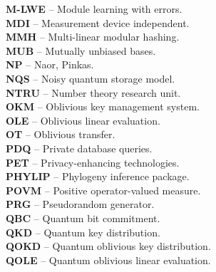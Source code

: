 \textbf{M-LWE} -- Module learning with errors.
\vspace{0.5cm}\\
\textbf{MDI} -- Measurement device independent.
\vspace{0.5cm}\\
\textbf{MMH} -- Multi-linear modular hashing.
\vspace{0.5cm}\\
\textbf{MUB} -- Mutually unbiased bases.
\vspace{0.5cm}\\
\textbf{NP} -- Naor, Pinkas.
\vspace{0.5cm}\\
\textbf{NQS} -- Noisy quantum storage model.
\vspace{0.5cm}\\
\textbf{NTRU} -- Number theory research unit.
\vspace{0.5cm}\\
\textbf{OKM} -- Oblivious key management system.
\vspace{0.5cm}\\
\textbf{OLE} -- Oblivious linear evaluation.
\vspace{0.5cm}\\
\textbf{OT} -- Oblivious transfer.
\vspace{0.5cm}\\
\textbf{PDQ} -- Private database queries.
\vspace{0.5cm}\\
\textbf{PET} -- Privacy-enhancing technologies.
\vspace{0.5cm}\\
\textbf{PHYLIP} -- Phylogeny inference package.
\vspace{0.5cm}\\
\textbf{POVM} -- Positive operator-valued measure.
\vspace{0.5cm}\\
\textbf{PRG} -- Pseudorandom generator.
\vspace{0.5cm}\\
\textbf{QBC} -- Quantum bit commitment.
\vspace{0.5cm}\\
\textbf{QKD} -- Quantum key distribution.
\vspace{0.5cm}\\
\textbf{QOKD} -- Quantum oblivious key distribution.
\vspace{0.5cm}\\
\textbf{QOLE} -- Quantum oblivious linear evaluation.
\vspace{0.5cm}\\
